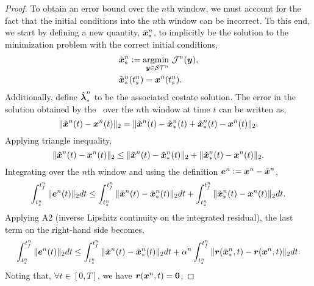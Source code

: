 \begin{proof}
To obtain an error bound over the $n$th window, we must account for the 
fact that the initial conditions into the $n$th window can be incorrect. To this end, 
we start by defining a new quantity, $\tilde{\boldsymbol x}_{*}^{n}$, to implicitly be the solution to the minimization problem with the correct initial conditions,
\begin{align*}
& \tilde{\boldsymbol x}_{*}^{n} \vcentcolon= \underset{\boldsymbol y \in \mathcal{ ST }^n}{\text{argmin } } \mathcal{J}^{n}(\boldsymbol y),\\
& \tilde{\boldsymbol x}_{*}^{n}(t_s^{n}) = {\boldsymbol x}^{n}(t_s^{n}).
\end{align*}
Additionally, define $\hat{\boldsymbol \lambda}_*^{n}$ to be the associated costate solution.
 The error in the solution obtained by the 
\methodAcronymROM\ over the $n$th window at time $t$ can be written as,
\begin{equation*}
\|  \tilde{\boldsymbol x}^{n}(t) - {\boldsymbol x}^{n}(t) \|_2 = 
\| \tilde{\boldsymbol x}^{n}(t) - \tilde{\boldsymbol x}_{*}^{n}(t) + \tilde{\boldsymbol x}_{*}^{n}(t) -  {\boldsymbol x}^{n}(t)  \|_2.
\end{equation*}
Applying triangle inequality,
\begin{equation*}
\|  \tilde{\boldsymbol x}^{n}(t) - {\boldsymbol x}^{n}(t) \|_2 \le 
\| \tilde{\boldsymbol x}^{n}(t) - \tilde{\boldsymbol x}_{*}^{n}(t) \|_2 + \|  \tilde{\boldsymbol x}_{*}^{n}(t) -  {\boldsymbol x}^{n}(t)  \|_2.
\end{equation*}
Integrating over the $n$th window and using the definition $\boldsymbol e^{n} \vcentcolon= {\boldsymbol x}^{n} - \tilde{\boldsymbol x}^{n}$,
$$\int_{t_s^{n}}^{t_f^{n}} \| \boldsymbol e^{n}(t) \|_2 dt \le \int_{t_s^{n}}^{t_f^{n}} \| \tilde{\boldsymbol x}^{n}(t) - \tilde{\boldsymbol x}_{*}^{n}(t) \|_2 dt +  \int_{t_s^{n}}^{t_f^{n}} \| \tilde{\boldsymbol x}_{*}^{n}(t) - {\boldsymbol x}^{n}(t) \|_2dt.$$
Applying A2 (inverse Lipshitz continuity on the integrated residual), the last term on the right-hand side becomes,
\begin{equation*}
\int_{t_s^{n}}^{t_f^{n}} \| \boldsymbol e^{n}(t) \|_2 dt \le \int_{t_s^{n}}^{t_f^{n}} \| \tilde{\boldsymbol x}^{n}(t) - \tilde{\boldsymbol x}_{*}^{n}(t) \|_2 dt +  \alpha^{n} \int_{t_s^{n}}^{t_f^{n}} \|  \boldsymbol r(\tilde{\boldsymbol x}_{*}^{n},t) - \boldsymbol r({\boldsymbol x}^{n},t) \|_2 dt.
\end{equation*}
Noting that, $\forall t \in [0,T]$, we have $\boldsymbol r({\boldsymbol x}^{n},t) = \boldsymbol 0$, 

\end{proof}
